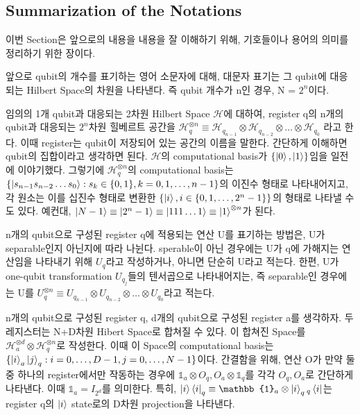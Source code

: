 \subsection{Summarization of the Notations}

이번 Section은 앞으로의 내용을 내용을 잘 이해하기 위해, 기호들이나 용어의 의미를 정리하기 위한 장이다.

앞으로 qubit의 개수를 표기하는 영어 소문자에 대해, 대문자 표기는 그 qubit에 대응되는 Hilbert Space의 차원을 나타낸다.
즉 qubit 개수가 n인 경우, N = \(2^n\)이다.

임의의 1개 qubit과 대응되는 2차원 Hilbert Space \(\mathcal{H}\)에 대하여, register q의 n개의 qubit과 대응되는 \(2^n\)차원 힐베르트 공간을 \(\mathcal{H}_q^{\otimes n} \equiv \mathcal{H}_{q_{n-1}} \otimes \mathcal{H}_{q_{n-2}} \otimes \dots \otimes \mathcal{H}_{q_{0}}\) 라고 한다.
이때 register는 qubit이 저장되어 있는 공간의 이름을 말한다. 간단하게 이해하면 qubit의 집합이라고 생각하면 된다.
\(\mathcal{H}\)의 computational basis가 \(\{ \ket{0}, \ket{1} \}\)임을 일전에 이야기했다. 그렇기에 \(\mathcal{H}_q^{\otimes n}\)의 computational basis는 \(\{ \ket{s_{n-1}s_{n-2}\dots s_0} : s_k \in \{0,1\}, k = 0,1,\dots , n-1\}\)의 이진수 형태로 나타내어지고, 각 원소는 이를 십진수 형태로 변환한 \(\{ \ket{i}, i \in \{0,1,\dots,2^n-1\} \} \)의 형태로 나타낼 수도 있다.
예컨대, \(\ket{N-1} \equiv \ket{2^n-1} \equiv \ket{111\dots 1} \equiv \ket{1}^{\otimes n}\)가 된다.

n개의 qubit으로 구성된 register q에 적용되는 연산 U를 표기하는 방법은, U가 separable인지 아닌지에 따라 나뉜다.
sperable이 아닌 경우에는 U가 q에 가해지는 연산임을 나타내기 위해 \(U_q\)라고 작성하거나, 아니면 단순히 U라고 적는다.
한편, U가 one-qubit transformation \(U_{q_j}\)들의 텐서곱으로 나타내어지는, 즉 separable인 경우에는 U를 \(U_q^{\otimes n} \equiv U_{q_{n-1}} \otimes U_{q_{n-2}} \otimes \dots \otimes U_{q_{0}}\)라고 적는다.

n개의 qubit으로 구성된 register q, d개의 qubit으로 구성된 register a를 생각하자. 두 레지스터는 N+D차원 Hibert Space로 합쳐질 수 있다. 이 합쳐진 Space를 \(\mathcal{H}_a^{\otimes d} \otimes \mathcal{H}_q^{\otimes n}\)로 작성한다. 이때 이 Space의 computational basis는 \(\{ \ket{i}_a \ket{j}_q : i = 0,\dots,D-1, j = 0,\dots,N-1\}\)이다.
간결함을 위해, 연산 O가 만약 둘 중 하나의 register에서만 작동하는 경우에 \(\mathbb{1}_a \otimes O_q, O_a \otimes \mathbb{1}_q\)를 각각 \(O_q, O_a\)로 간단하게 나타낸다. 이때 \(\mathbb{1}_a = I_{2^d}\)를 의미한다.
특히, \(\ket{i}\bra{i}_q \equiv \mathbb{1}_a \otimes \ket{i}_q {_q}\bra{i}\)는 register q의 \(\ket{i}\) state로의 D차원 projection을 나타낸다.

